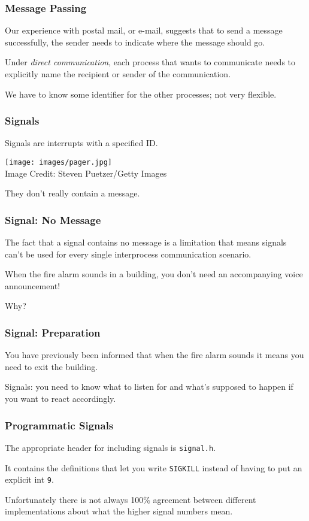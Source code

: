 \begin{frame}
	\frametitle{Message Passing}

	Our experience with postal mail, or e-mail, suggests that to send a message successfully, the sender needs to indicate where the message should go.

	Under \textit{direct communication}, each process that wants to communicate needs to explicitly name the recipient or sender of the communication.

	We have to know some identifier for the other processes; not very flexible.
\end{frame}

\begin{frame}
	\frametitle{Signals}

	Signals are interrupts with a specified ID.

	\begin{center}
		\texttt{[image: images/pager.jpg]}\\
		{\footnotesize Image Credit: Steven Puetzer/Getty Images}
	\end{center}

	They don't really contain a message.

\end{frame}


\begin{frame}
	\frametitle{Signal: No Message}

	The fact that a signal contains no message is a limitation that means signals can't be used for every single interprocess communication scenario.

	When the fire alarm sounds in a building, you don't need an accompanying voice announcement!

	Why?

\end{frame}



\begin{frame}
	\frametitle{Signal: Preparation}

	You have previously been informed that when the fire alarm sounds it means you need to exit the building.

	Signals: you need to know what to listen for and what's supposed to happen if you want to react accordingly.

\end{frame}


\begin{frame}
	\frametitle{Programmatic Signals}

	The appropriate header for including signals is \texttt{signal.h}.

	It contains the definitions that let you write \texttt{SIGKILL} instead of having to put an explicit int \texttt{9}.

	Unfortunately there is not always 100\% agreement between different implementations about what the higher signal numbers mean.

\end{frame}


